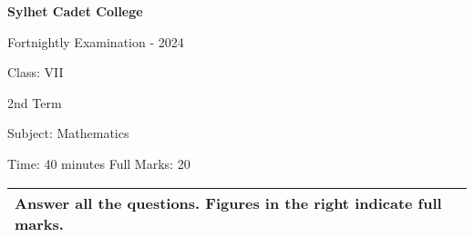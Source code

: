 \documentclass[10pt]{article}
\begin{document}
\begin{center}
  \bfseries\large
  Sylhet Cadet College

\normalsize
Fortnightly Examination - 2024

  Class: VII
  
  2nd Term

  Subject: Mathematics

  Time: 40 minutes \qquad \qquad  \qquad \qquad \qquad  \qquad \qquad  \qquad Full Marks: 20

\end{center}

\noindent
\begin{tabular}{p{\dimexpr\linewidth-2\tabcolsep}}
  \textbf{Answer all the questions. Figures in the right indicate full marks.}\\
  \hline
\end{tabular}
\end{document}
